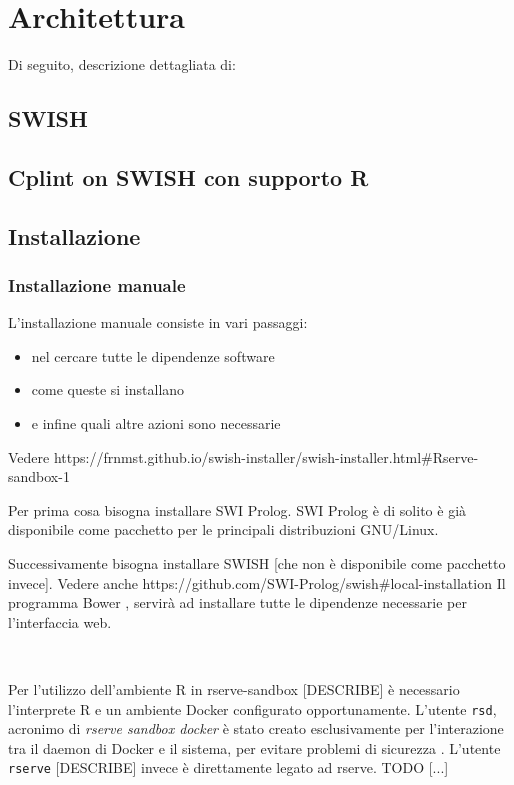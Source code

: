\documentclass[10pt,titlepage,twoside,a4paper]{report}
\begin{document}


\chapter{Architettura}
Di seguito, descrizione dettagliata di:
    \section{SWISH}
    \section{Cplint on SWISH con supporto R}
    \section{Installazione}
        \subsection{Installazione manuale}
L'installazione manuale consiste in vari passaggi:
\begin{itemize}
    \item nel cercare tutte le dipendenze software
    \item come queste si installano
    \item e infine quali altre azioni sono necessarie
\end{itemize}
Vedere https://frnmst.github.io/swish-installer/swish-installer.html\#Rserve-sandbox-1

Per prima cosa bisogna installare SWI Prolog. SWI Prolog è di 
solito è già disponibile come pacchetto per le principali distribuzioni 
GNU/Linux.

Successivamente bisogna installare SWISH [che non è disponibile come
pacchetto invece]. Vedere 
anche
https://github.com/SWI-Prolog/swish\#local-installation
Il programma Bower \cite{bower}, servirà ad installare
tutte le dipendenze necessarie per l'interfaccia web.

~

Per l'utilizzo dell'ambiente R in rserve-sandbox [DESCRIBE] è necessario 
l'interprete R e un ambiente Docker configurato opportunamente.
L'utente \texttt{rsd}, acronimo di \emph{rserve sandbox docker} è stato creato
esclusivamente per l'interazione tra il daemon di Docker e il sistema, per 
evitare problemi di sicurezza \cite{DockerPrivilegeEscalation0} 
\cite{DockerPrivilegeEscalation1}. L'utente \texttt{rserve} [DESCRIBE] invece è 
direttamente legato ad rserve. TODO [...]
\end{document}
